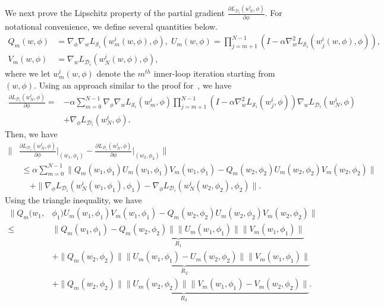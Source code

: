 \documentclass{osudissert96}
\begin{document}
We next prove the Lipschitz property of the partial gradient $\frac{\partial L_{\mathcal{D}_i}( w^i_N, \phi)}{\partial \phi}$. For notational convenience, we define several quantities below.
\begin{align}\label{eq:notations}
Q_m(w,\phi) &= \nabla_\phi\nabla_w L_{\mathcal{S}_i}(w_{m}^i(w,\phi),\phi), \;U_m(w,\phi)  = \prod_{j=m+1}^{N-1}(I-\alpha\nabla_w^2L_{\mathcal{S}_i}(w_{j}^i(w,\phi),\phi)), \nonumber
\\V_m(w,\phi) & = \nabla_w L_{\mathcal{D}_i}(w_N^i(w,\phi),\phi),
\end{align}
where we let $w_m^i(w,\phi)$ denote the $m^{th}$ inner-loop iteration starting from $(w,\phi)$.
Using an approach similar to the proof for~, we have
\begin{align}\label{eq:ainiyo11}
\frac{\partial L_{\mathcal{D}_i}( w^i_{N}, \phi)}{\partial \phi} =& -\alpha \sum_{m=0}^{N-1}\nabla_\phi\nabla_w L_{\mathcal{S}_i}(w_{m}^i,\phi) \prod_{j=m+1}^{N-1}(I-\alpha\nabla_w^2L_{\mathcal{S}_i}(w_{j}^i,\phi))\nabla_w L_{\mathcal{D}_i}(w_{N}^i,\phi) \nonumber
\\&+\nabla_\phi L_{\mathcal{D}_i}(w_{N}^i,\phi).
\end{align}
 Then, we have 
\begin{align}\label{eq:sect}
\Big\|&\frac{\partial L_{\mathcal{D}_i}( w^i_N, \phi)}{\partial \phi}\Big |_{(w_1,\phi_1)}  - \frac{\partial L_{\mathcal{D}_i}( w^i_N, \phi)}{\partial \phi} \Big |_{(w_2,\phi_2)}\Big\| \nonumber
\\&\;\leq \alpha\sum_{m=0}^{N-1}\|Q_m(w_1,\phi_1)U_m(w_1,\phi_1)V_m(w_1,\phi_1)-Q_m(w_2,\phi_2)U_m(w_2,\phi_2)V_m(w_2,\phi_2)\|  \nonumber
\\&\;\quad+\|\nabla_\phi L_{\mathcal{D}_i}(w_{N}^i(w_1,\phi_1),\phi_1)-\nabla_\phi L_{\mathcal{D}_i}(w_{N}^i(w_2,\phi_2),\phi_2)\|.
\end{align}
Using the triangle inequality, we have 
\begin{align}\label{R1R2R3} 
 \|Q_m(w_1,&\phi_1)U_m(w_1,\phi_1)V_m(w_1,\phi_1)-Q_m(w_2,\phi_2)U_m(w_2,\phi_2)V_m(w_2,\phi_2)\| \nonumber
 \\\leq &\underbrace{\|Q_m(w_1,\phi_1)-Q_m(w_2,\phi_2)\|\|U_m(w_1,\phi_1)\|\|V_m(w_1,\phi_1)\|}_{R_1}  \nonumber
 \\&+ \underbrace{\|Q_m(w_2,\phi_2)\|\|U_m(w_1,\phi_1)-U_m(w_2,\phi_2)\|\|V_m(w_1,\phi_1)\|}_{R_2}\nonumber
 \\&+\underbrace{\|Q_m(w_2,\phi_2)\|\|U_m(w_2,\phi_2)\|\|V_m(w_1,\phi_1)-V_m(w_2,\phi_2)\|}_{R_3}.
\end{align} 
\end{document}
